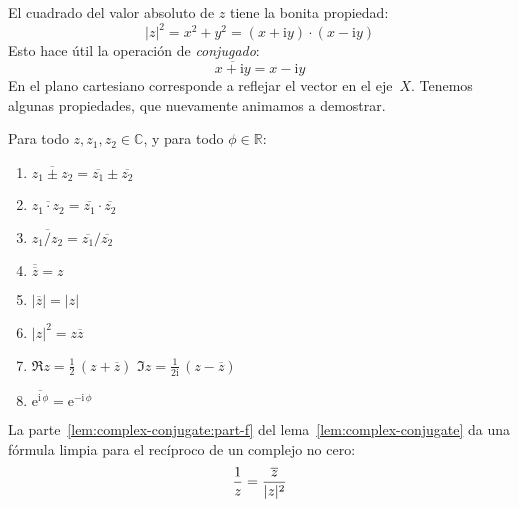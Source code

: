   El cuadrado del valor absoluto de \(z\) tiene la bonita propiedad:
  \begin{equation}
    \label{eq:complex-modulus-conjugates}
    \lvert z \rvert^2
      = x^2 + y^2
      = (x + \mathrm{i} y) \cdot (x - \mathrm{i} y)
  \end{equation}
  Esto hace útil la operación de \emph{conjugado}:%
  \begin{equation}
    \label{eq:complex-conjugate}
    \overline{x + \mathrm{i} y}
      = x - \mathrm{i} y
  \end{equation}
  En el plano cartesiano
  corresponde a reflejar el vector en el eje~\(X\).
  Tenemos algunas propiedades,
  que nuevamente animamos a demostrar.
  \begin{lemma}
    \label{lem:complex-conjugate}
    Para todo \(z, z_1, z_2 \in \mathbb{C}\),
    y para todo \(\phi \in \mathbb{R}\):
    \begin{enumerate}[label=(\roman*), ref=(\roman*)]
    \item
      \(\overline{z_1 \pm z_2} = \overline{z_1} \pm \overline{z_2}\)
    \item
      \(\overline{z_1 \cdot z_2}
	   = \overline{z_1} \cdot \overline{z_2}\)
    \item
      \(\overline{z_1 / z_2} = \overline{z_1} / \overline{z_2}\)
    \item
      \(\overline{\overline{z}} = z\)
    \item
      \(\lvert \overline{z} \rvert = \lvert z \rvert\)
    \item
      \label{lem:complex-conjugate:part-f}
      \(\lvert z \rvert^2 = z \overline{z}\)
    \item
      \(\Re z = \frac{1}{2} \, ( z + \overline{z})\)
      \qquad
      \(\Im z = \frac{1}{2 \mathrm{i}} \, ( z - \overline{z})\)
    \item
      \(\overline{\mathrm{e}^{\mathrm{i} \, \phi}}
	  = \mathrm{e}^{- \mathrm{i} \, \phi}\)
    \end{enumerate}
  \end{lemma}
  La parte~\ref{lem:complex-conjugate:part-f}
  del lema~\ref{lem:complex-conjugate}
  da una fórmula limpia para el recíproco de un complejo no cero:
  \begin{equation}
    \index{C (numeros complejos)@\(\mathbb{C}\) (números complejos)!reciproco@recíproco}
    \label{eq:complex-inverse}
    \frac{1}{z}
      = \frac{\overline{z}}{\lvert z \rvert^2}
  \end{equation}

